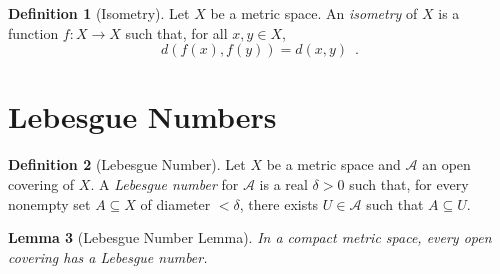 \documentclass{report}
\newtheorem{lm}{Lemma}[section]
\theoremstyle{definition}
\newtheorem{df}[lm]{Definition}
\begin{document}
  \begin{df}[Isometry]
    Let $X$ be a metric space. An \emph{isometry} of $X$ is a function $f : X
    \rightarrow X$ such that, for all $x, y \in X$,
    \[ d(f(x), f(y)) = d(x, y) \enspace . \]
  \end{df}

  \section{Lebesgue Numbers}

  \begin{df}[Lebesgue Number]
    Let $X$ be a metric space and $\mathcal{A}$ an open covering of $X$. A
    \emph{Lebesgue number} for $\mathcal{A}$ is a real $\delta > 0$ such that,
    for every nonempty set $A \subseteq X$ of diameter $< \delta$, there exists
    $U \in \mathcal{A}$ such that $A \subseteq U$.
  \end{df}

  \begin{lm}[Lebesgue Number Lemma]
    In a compact metric space, every open covering has a Lebesgue number.
  \end{lm}
\end{document}
